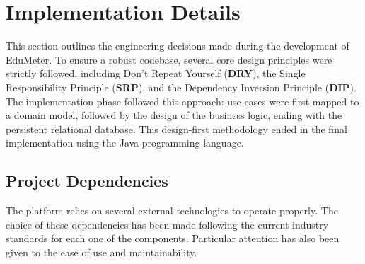 \section{Implementation Details}
This section outlines the engineering decisions made during the development of EduMeter. To ensure a robust codebase, several core design principles were strictly followed, including Don’t Repeat Yourself (\textbf{DRY}), the Single Responsibility Principle (\textbf{SRP}), and the Dependency Inversion Principle (\textbf{DIP}). \\

The implementation phase followed this approach: use cases were first mapped to a domain model, followed by the design of the business logic, ending with the persistent relational database. This design-first methodology ended in the final implementation using the Java programming language.

\subsection{Project Dependencies} \label{project-dependencies}
The platform relies on several external technologies to operate properly. The choice of these dependencies has been made following the current industry standards for each one of the components. Particular attention has also been given to the ease of use and maintainability.

